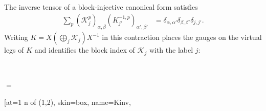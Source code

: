 The inverse tensor of a block-injective canonical form satisfies
\begin{align}
    \sum_p(\mathcal K_j^p)_{\alpha,\beta}
    (K^{-1,p}_{j'})_{\alpha',\beta'}
     & =\delta_{\alpha,\alpha'}\delta_{\beta,\beta'}\delta_{j,j'}.
    \label{eq:mpdo_inverse_tensor}
\end{align}
Writing $K=X(\bigoplus_j\mathcal K_j)X^{-1}$ in this contraction places the
gauges on the virtual legs of $K$ and identifies the block index of
$\mathcal K_j$ with the label $j$:
\begin{tenkzequation}
    \tenkzkernel
    \begin{tenkz}[rows={op,op}, cols=1, west=open, east=open]
         \\
    \end{tenkz}
    $ = $
    \begin{tenkz}[rows={wire,wire,wire}, cols=3, bonds=none]
        \tn[at={1 n of (1,2)}, skin=box, name=Kinv,

\end{tenkz}
\end{tenkzequation}
